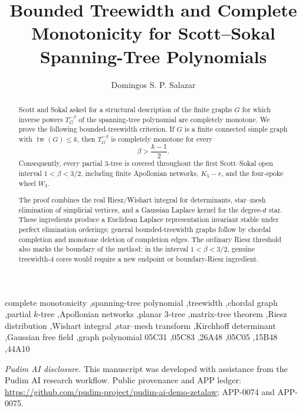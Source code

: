 \documentclass[preprint,12pt,authoryear]{elsarticle}
\numberwithin{equation}{section}
\theoremstyle{definition}
\theoremstyle{remark}
\newcommand{\1}{\mathbf{1}}
\begin{document}
\begin{frontmatter}

\title{Bounded Treewidth and Complete Monotonicity for Scott--Sokal Spanning-Tree Polynomials}

\author[addr1]{Domingos S. P. Salazar}
\address[addr1]{Unidade de Educa\c{c}\~ao a Dist\^ancia e Tecnologia,
Universidade Federal Rural de Pernambuco,
52171-900 Recife, Pernambuco, Brazil}

\begin{abstract}
Scott and Sokal asked for a structural description of the finite graphs \(G\) for which inverse powers \(T_G^{-\beta}\) of the spanning-tree polynomial are completely monotone.  We prove the following bounded-treewidth criterion.  If \(G\) is a finite connected simple graph with \(\operatorname{tw}(G)\le k\), then \(T_G^{-\beta}\) is completely monotone for every
\[
        \beta>\frac{k-1}{2}.
\]
Consequently, every partial \(3\)-tree is covered throughout the first Scott--Sokal open interval \(1<\beta<3/2\), including finite Apollonian networks, \(K_5-e\), and the four-spoke wheel \(W_4\).

The proof combines the real Riesz/Wishart integral for determinants, star--mesh elimination of simplicial vertices, and a Gaussian Laplace kernel for the degree-\(d\) star.  These ingredients produce a Euclidean Laplace representation invariant stable under perfect elimination orderings; general bounded-treewidth graphs follow by chordal completion and monotone deletion of completion edges.  The ordinary Riesz threshold also marks the boundary of the method: in the interval \(1<\beta<3/2\), genuine treewidth-\(4\) cores would require a new endpoint or boundary-Riesz ingredient.
\end{abstract}

\begin{keyword}
complete monotonicity \sep spanning-tree polynomial \sep treewidth
\sep chordal graph \sep partial \(k\)-tree \sep Apollonian networks
\sep planar \(3\)-tree \sep matrix-tree theorem
\sep Riesz distribution \sep Wishart integral \sep star--mesh transform
\sep Kirchhoff determinant \sep Gaussian free field \sep graph polynomial
\MSC[2020] 05C31 \sep 05C83 \sep 26A48 \sep 05C05 \sep 15B48 \sep 44A10
\end{keyword}

\end{frontmatter}

\begingroup
\small
\noindent\textit{Pudim AI disclosure.}
This manuscript was developed with assistance from the Pudim AI research workflow.
Public provenance and APP ledger:
\url{https://github.com/pudim-project/pudim-ai-demo-zetalaw}; APP-0074 and APP-0075.
\par
\endgroup
\end{document}
